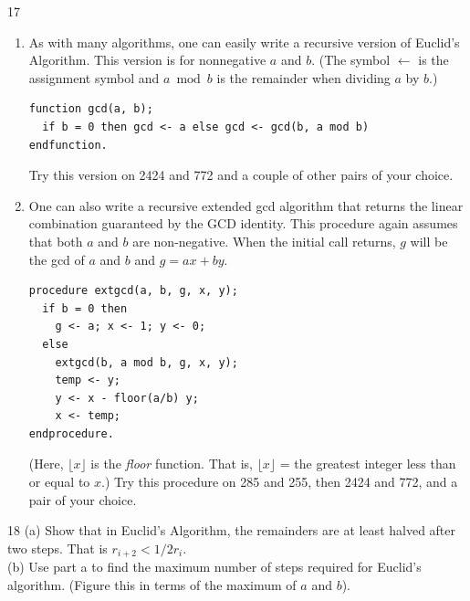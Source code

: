\begin{problem}{17}
    \begin{enumerate}
        \item[(a)] As with many algorithms, one can easily write a recursive version of
        Euclid's Algorithm. This version is for nonnegative $a$ and $b$. (The symbol
        $\leftarrow$ is the assignment symbol and $a \bmod b$ is the remainder when
        dividing $a$ by $b$.)
\begin{verbatim}
function gcd(a, b);
  if b = 0 then gcd <- a else gcd <- gcd(b, a mod b)
endfunction.
\end{verbatim}
        Try this version on 2424 and 772 and a couple of other pairs of your choice.
        \item[(b)] One can also write a recursive extended gcd algorithm that returns
        the linear combination guaranteed by the GCD identity. This procedure again
        assumes that both $a$ and $b$ are non-negative. When the initial call returns,
        $g$ will be the gcd of $a$ and $b$ and $g = ax + by$.
\begin{verbatim}
procedure extgcd(a, b, g, x, y);
  if b = 0 then
    g <- a; x <- 1; y <- 0;
  else
    extgcd(b, a mod b, g, x, y);
    temp <- y;
    y <- x - floor(a/b) y;
    x <- temp;
endprocedure.
\end{verbatim}
        (Here, $\lfloor x \rfloor$ is the \emph{floor} function. That is,
        $\lfloor x \rfloor$ = the greatest integer less than or equal to $x$.)
        Try this procedure on 285 and 255, then 2424 and 772, and a pair of your choice.
    \end{enumerate}
\end{problem}
\unsolved

\begin{problem}{18}
    (a) Show that in Euclid's Algorithm, the remainders are at least halved
    after two steps. That is $r_{i + 2} < 1/2 r_i$. \\

    (b) Use part a to find the maximum number of steps required for Euclid's
    algorithm. (Figure this in terms of the maximum of $a$ and $b$).
\end{problem}
\solved

